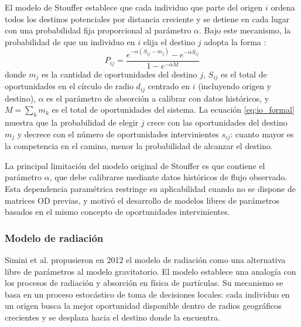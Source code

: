 El modelo de Stouffer establece que cada individuo que parte del origen $i$ ordena todos los destinos potenciales por distancia creciente y se detiene en cada lugar con una probabilidad fija proporcional al parámetro $\alpha$. Bajo este mecanismo, la probabilidad de que un individuo en $i$ elija el destino $j$ adopta la forma \cite{stouffer1940intervening, liu2020intervening}:
\begin{equation}
    P_{ij} = \frac{e^{-\alpha(S_{ij} - m_j)} - e^{-\alpha S_{ij}}}{1 - e^{-\alpha M}}
    \label{eq:io_formal}
\end{equation}
donde $m_j$ es la cantidad de oportunidades del destino $j$, $S_{ij}$ es el total de oportunidades en el círculo de radio $d_{ij}$ centrado en $i$ (incluyendo origen y destino), $\alpha$ es el parámetro de absorción a calibrar con datos históricos, y $M = \sum_k m_k$ es el total de oportunidades del sistema. La ecuación \eqref{eq:io_formal} muestra que la probabilidad de elegir $j$ crece con las oportunidades del destino $m_j$ y decrece con el número de oportunidades intervinientes $s_{ij}$: cuanto mayor es la competencia en el camino, menor la probabilidad de alcanzar el destino.

La principal limitación del modelo original de Stouffer es que contiene el parámetro $\alpha$, que debe calibrarse mediante datos históricos de flujo observado. Esta dependencia paramétrica restringe su aplicabilidad cuando no se dispone de matrices OD previas, y motivó el desarrollo de modelos libres de parámetros basados en el mismo concepto de oportunidades intervinientes.

\subsubsection{Modelo de radiación}

Simini et al. \cite{simini2012universal} propusieron en 2012 el modelo de radiación como una alternativa libre de parámetros al modelo gravitatorio. El modelo establece una analogía con los procesos de radiación y absorción en física de partículas. Su mecanismo se basa en un proceso estocástico de toma de decisiones locales: cada individuo en un origen busca la mejor oportunidad disponible dentro de radios geográficos crecientes y se desplaza hacia el destino donde la encuentra.

